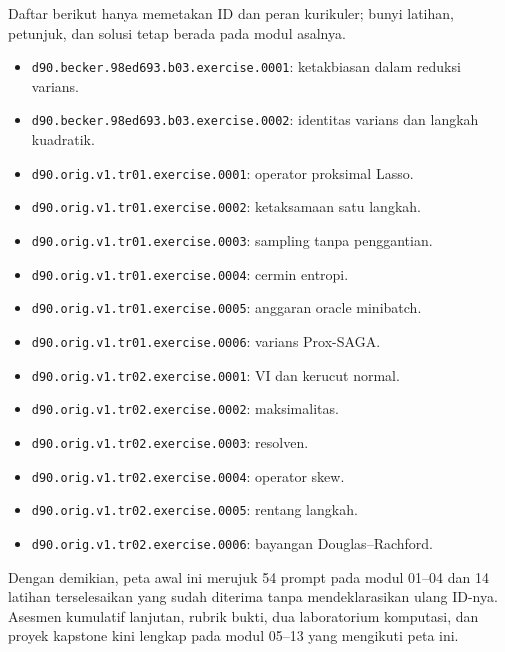 Daftar berikut hanya memetakan ID dan peran kurikuler; bunyi latihan, petunjuk,
dan solusi tetap berada pada modul asalnya.
\begin{itemize}
\item \texttt{d90.becker.98ed693.b03.exercise.0001}: ketakbiasan dalam
  reduksi varians.
\item \texttt{d90.becker.98ed693.b03.exercise.0002}: identitas varians dan
  langkah kuadratik.
\item \texttt{d90.orig.v1.tr01.exercise.0001}: operator proksimal Lasso.
\item \texttt{d90.orig.v1.tr01.exercise.0002}: ketaksamaan satu langkah.
\item \texttt{d90.orig.v1.tr01.exercise.0003}: sampling tanpa penggantian.
\item \texttt{d90.orig.v1.tr01.exercise.0004}: cermin entropi.
\item \texttt{d90.orig.v1.tr01.exercise.0005}: anggaran oracle minibatch.
\item \texttt{d90.orig.v1.tr01.exercise.0006}: varians Prox-SAGA.
\item \texttt{d90.orig.v1.tr02.exercise.0001}: VI dan kerucut normal.
\item \texttt{d90.orig.v1.tr02.exercise.0002}: maksimalitas.
\item \texttt{d90.orig.v1.tr02.exercise.0003}: resolven.
\item \texttt{d90.orig.v1.tr02.exercise.0004}: operator skew.
\item \texttt{d90.orig.v1.tr02.exercise.0005}: rentang langkah.
\item \texttt{d90.orig.v1.tr02.exercise.0006}: bayangan Douglas--Rachford.
\end{itemize}

Dengan demikian, peta awal ini merujuk 54 prompt pada modul 01--04 dan 14
latihan terselesaikan yang sudah diterima tanpa mendeklarasikan ulang ID-nya.
Asesmen kumulatif lanjutan, rubrik bukti, dua laboratorium komputasi, dan
proyek kapstone kini lengkap pada modul 05--13 yang mengikuti peta ini.
